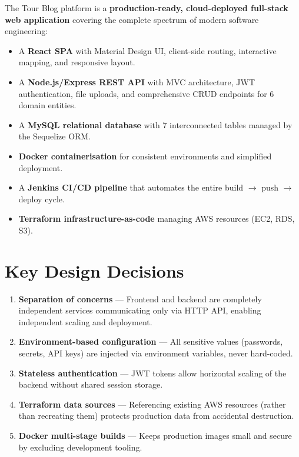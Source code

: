 \documentclass[12pt,a4paper]{report}
\begin{document}
The Tour Blog platform is a \textbf{production-ready, cloud-deployed full-stack web application} covering the complete spectrum of modern software engineering:

\begin{itemize}[leftmargin=2em]
  \item A \textbf{React SPA} with Material Design UI, client-side routing, interactive mapping, and responsive layout.
  \item A \textbf{Node.js/Express REST API} with MVC architecture, JWT authentication, file uploads, and comprehensive CRUD endpoints for 6 domain entities.
  \item A \textbf{MySQL relational database} with 7 interconnected tables managed by the Sequelize ORM.
  \item \textbf{Docker containerisation} for consistent environments and simplified deployment.
  \item A \textbf{Jenkins CI/CD pipeline} that automates the entire build $\rightarrow$ push $\rightarrow$ deploy cycle.
  \item \textbf{Terraform infrastructure-as-code} managing AWS resources (EC2, RDS, S3).
\end{itemize}

\section{Key Design Decisions}

\begin{enumerate}[leftmargin=2em]
  \item \textbf{Separation of concerns} — Frontend and backend are completely independent services communicating only via HTTP API, enabling independent scaling and deployment.
  \item \textbf{Environment-based configuration} — All sensitive values (passwords, secrets, API keys) are injected via environment variables, never hard-coded.
  \item \textbf{Stateless authentication} — JWT tokens allow horizontal scaling of the backend without shared session storage.
  \item \textbf{Terraform data sources} — Referencing existing AWS resources (rather than recreating them) protects production data from accidental destruction.
  \item \textbf{Docker multi-stage builds} — Keeps production images small and secure by excluding development tooling.
\end{enumerate}
\end{document}
